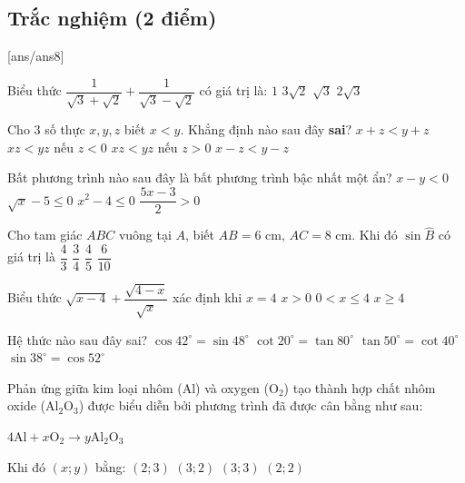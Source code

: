 \setcounter{ex}{0} %
\subsection{Trắc nghiệm (2 điểm)}
[ans/ans8]
\begin{ex}
Biểu thức $\dfrac{1}{\sqrt{3}+\sqrt{2}}+\dfrac{1}{\sqrt{3}-\sqrt{2}}$ có giá trị là:
\choice
{$1$}
{$3\sqrt{2}$}
{$\sqrt{3}$}
{\True $2\sqrt{3}$}
\end{ex}

\begin{ex}
Cho 3 số thực $x,y,z$ biết $x<y$. Khẳng định nào sau đây \textbf{sai}?
\choice
{$x+z<y+z$}
{\True $xz<yz$ nếu $z<0$}
{$xz<yz$ nếu $z>0$}
{$x-z<y-z$}
\end{ex}

\begin{ex}
Bất phương trình nào sau đây là bất phương trình bậc nhất một ẩn?
\choice
{$x-y<0$}
{$\sqrt{x}-5\le0$}
{$x^2-4\le0$}
{\True $\dfrac{5x-3}{2}>0$}
\end{ex}

\begin{ex}
Cho tam giác $ABC$ vuông tại $A$, biết $AB=6$ cm, $AC=8$ cm. Khi đó $\sin\widehat{B}$ có giá trị là
\choice
{$\dfrac{4}{3}$}
{$\dfrac{3}{4}$}
{\True $\dfrac{4}{5}$}
{$\dfrac{6}{10}$}
\end{ex}

\begin{ex}
Biểu thức $\sqrt{x-4}+\dfrac{\sqrt{4-x}}{\sqrt{x}}$ xác định khi
\choice
{\True $x=4$}
{$x>0$}
{$0<x\le 4$}
{$x\ge 4$}
\end{ex}

\begin{ex}
Hệ thức nào sau đây sai?
\choice
{$\cos42^\circ=\sin48^\circ$}
{\True $\cot20^\circ=\tan80^\circ$}
{$\tan50^\circ=\cot40^\circ$}
{$\sin38^\circ=\cos52^\circ$}
\end{ex}

\begin{ex}
Phản ứng giữa kim loại nhôm (Al) và oxygen ($\text{O}_{2}$) tạo thành hợp chất nhôm oxide ($\text{Al}_{2}\text{O}_{3}$) được biểu diễn bởi phương trình đã được cân bằng như sau:

\begin{center}
    $4\text{Al}+x\text{O}_{2} \rightarrow y\text{Al}_{2}\text{O}_{3}$
\end{center}
Khi đó $(x;y)$ bằng:
\choice
{$(2;3)$}
{\True $(3;2)$}
{$(3;3)$}
{$(2;2)$}
\end{ex}

